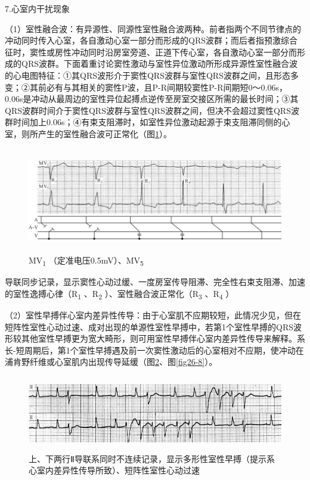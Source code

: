 7.心室内干扰现象

（1）室性融合波：有异源性、同源性室性融合波两种。前者指两个不同节律点的冲动同时传入心室，各自激动心室一部分而形成的QRS波群；而后者指预激综合征时，窦性或房性冲动同时沿房室旁道、正道下传心室，各自激动心室一部分而形成的QRS波群。下面着重讨论窦性激动与室性异位激动所形成异源性室性融合波的心电图特征：①其QRS波形介于窦性QRS波群与室性QRS波群之间，且形态多变；②其前必有与其相关的窦性P波，且P-R间期较窦性P-R间期短0～0.06s，0.06s是冲动从最周边的室性异位起搏点逆传至房室交接区所需的最长时间；③其QRS波群时间介于窦性QRS波群与室性QRS波群之间，但决不会超过窦性QRS波群时间加上0.06s；④有束支阻滞时，如室性异位激动起源于束支阻滞同侧的心室，则所产生的室性融合波可正常化（图\ref{fig26-6}）。

\begin{figure}[!htbp]
 \centering
 \includegraphics[width=5.80208in,height=1.8125in]{./images/Image00447.jpg}
 \captionsetup{justification=centering}
 \caption{MV\textsubscript{1} （定准电压0.5mV）、MV\textsubscript{5}}
 \label{fig26-6}
  \end{figure} 
导联同步记录，显示窦性心动过缓、一度房室传导阻滞、完全性右束支阻滞、加速的室性逸搏心律（R\textsubscript{1}
、R\textsubscript{2} ）、室性融合波正常化（R\textsubscript{3}
、R\textsubscript{4} ）

（2）室性早搏伴心室内差异性传导：由于心室肌不应期较短，此情况少见，但在短阵性室性心动过速、成对出现的单源性室性早搏中，若第1个室性早搏的QRS波形较其他室性早搏更为宽大畸形，则可用室性早搏伴心室内差异性传导来解释。系长-短周期后，第1个室性早搏遇及前一次窦性激动后的心室相对不应期，使冲动在浦肯野纤维或心室肌内出现传导延缓（图\ref{fig26-7}、图\ref{fig26-8}）。

\begin{figure}[!htbp]
 \centering
 \includegraphics[width=5.58333in,height=1.29167in]{./images/Image00448.jpg}
 \captionsetup{justification=centering}
 \caption{上、下两行Ⅱ导联系同时不连续记录，显示多形性室性早搏（提示系心室内差异性传导所致）、短阵性室性心动过速}
 \label{fig26-7}
  \end{figure} 

